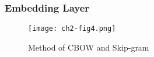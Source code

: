 \subsubsection{Embedding Layer}



\begin{figure}[h]
	\centering
	\texttt{[image: ch2-fig4.png]}
	\caption{Method of CBOW and Skip-gram}\label{ch2-fig4}
\end{figure}



